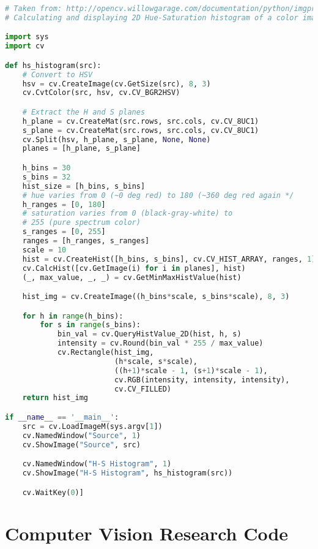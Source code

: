 \begin{lstlisting}[language=python,breaklines=true,label=lst:opencv_histogram,
caption={Example Histogram calculation and displaying code from OpenCV\cite{opencv_library}.}, frame=single] 
# Taken from: http://opencv.willowgarage.com/documentation/python/imgproc_histograms.html#calchist
# Calculating and displaying 2D Hue-Saturation histogram of a color image

import sys
import cv

def hs_histogram(src):
    # Convert to HSV
    hsv = cv.CreateImage(cv.GetSize(src), 8, 3)
    cv.CvtColor(src, hsv, cv.CV_BGR2HSV)

    # Extract the H and S planes
    h_plane = cv.CreateMat(src.rows, src.cols, cv.CV_8UC1)
    s_plane = cv.CreateMat(src.rows, src.cols, cv.CV_8UC1)
    cv.Split(hsv, h_plane, s_plane, None, None)
    planes = [h_plane, s_plane]

    h_bins = 30
    s_bins = 32
    hist_size = [h_bins, s_bins]
    # hue varies from 0 (~0 deg red) to 180 (~360 deg red again */
    h_ranges = [0, 180]
    # saturation varies from 0 (black-gray-white) to
    # 255 (pure spectrum color)
    s_ranges = [0, 255]
    ranges = [h_ranges, s_ranges]
    scale = 10
    hist = cv.CreateHist([h_bins, s_bins], cv.CV_HIST_ARRAY, ranges, 1)
    cv.CalcHist([cv.GetImage(i) for i in planes], hist)
    (_, max_value, _, _) = cv.GetMinMaxHistValue(hist)

    hist_img = cv.CreateImage((h_bins*scale, s_bins*scale), 8, 3)

    for h in range(h_bins):
        for s in range(s_bins):
            bin_val = cv.QueryHistValue_2D(hist, h, s)
            intensity = cv.Round(bin_val * 255 / max_value)
            cv.Rectangle(hist_img,
                         (h*scale, s*scale),
                         ((h+1)*scale - 1, (s+1)*scale - 1),
                         cv.RGB(intensity, intensity, intensity), 
                         cv.CV_FILLED)
    return hist_img

if __name__ == '__main__':
    src = cv.LoadImageM(sys.argv[1])
    cv.NamedWindow("Source", 1)
    cv.ShowImage("Source", src)

    cv.NamedWindow("H-S Histogram", 1)
    cv.ShowImage("H-S Histogram", hs_histogram(src))

    cv.WaitKey(0)]
\end{lstlisting}


\section{Computer Vision Research Code}

